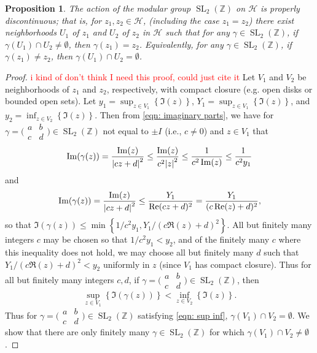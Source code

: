 \documentclass[10pt,leqno,twoside]{article}
\theoremstyle{plain}
\newtheorem{proposition}[lem]{Proposition}
\theoremstyle{definition}
\numberwithin{equation}{section}
\numberwithin{lem}{section}
\newcommand{\cbr}[1]{\left\{#1\right\}}
\DeclareMathOperator{\SL}{SL}
\newcommand{\slz}{\SL_2(\mathbb{Z})}
\newcommand{\sai}[1]{\textcolor{red}{#1}}
\begin{document}
\begin{proposition}\label{prop: properly discontinuous}
    The action of the modular group $\slz$ on $\mathcal H$ is properly discontinuous; that is, for $z_1,z_2\in \mathcal H$, (including the case $z_1 = z_2$) there exist neighborhoods $U_1$ of $z_1$ and $U_2$ of $z_2$ in $\mathcal H$ such that for any $\gamma\in \slz$, if $\gamma(U_1)\cap U_2\neq \emptyset$, then $\gamma(z_1) = z_2$. Equivalently, for any $\gamma\in\slz$, if $\gamma(z_1)\neq z_2$, then $\gamma(U_1)\cap U_2= \emptyset$.
\end{proposition}
\begin{proof}\sai{i kind of don't think I need this proof, could just cite it}
    Let $V_1$ and $V_2$ be neighborhoods of $z_1$ and $z_2$, respectively, with compact closure (e.g. open disks or bounded open sets). Let $y_1 = \sup_{z\in V_1}\cbr{\Im(z)}$, $Y_1 = \sup_{z\in V_1}\cbr{\Im(z)}$, and $y_2 = \inf_{z\in V_2}\cbr{\Im(z)}$. Then from \cref{eqn: imaginary parts}, we have for $\gamma = \big(\!\begin{smallmatrix}
        a & b \\ c & d
    \end{smallmatrix}\!\big)\in \slz$ not equal to $\pm I$ (i.e., $c\neq 0$) and $z\in V_1$ that \[\Im(\gamma(z)) = \frac{\Im(z)}{\abs{cz+d}^2}\leq \frac{\Im(z)}{c^2\abs{z}^2}\leq \frac{1}{c^2\Im(z)}\leq \frac{1}{c^2y_1}\] and \[\Im(\gamma(z)) = \frac{\Im(z)}{\abs{cz+d}^2}\leq \frac{Y_1}{\Re(cz+d)^2} = \frac{Y_1}{(c\Re(z)+d)^2},\] so that $\Im(\gamma(z))\leq\min\cbr{1/c^2y_1,Y_1/(c\Re(z)+d)^2}$. All but finitely many integers $c$ may be chosen so that $1/c^2y_1< y_2$, and of the finitely many $c$ where this inequality does not hold, we may choose all but finitely many $d$ such that $Y_1/(c\Re(z)+d)^2< y_2$ uniformly in $z$ (since $V_1$ has compact closure). Thus for all but finitely many integers $c,d$, if $\gamma  = \big(\!\begin{smallmatrix}
        a & b \\ c & d
    \end{smallmatrix}\!\big)\in \slz$, then \begin{equation}\label{eqn: sup inf}
        \sup_{z\in V_1}\cbr{\Im(\gamma(z))}< \inf_{z\in V_2}\cbr{\Im(z)}.
    \end{equation} Thus for $\gamma = \big(\!\begin{smallmatrix}
        a & b \\ c & d
    \end{smallmatrix}\!\big)\in \slz$ satisfying \cref{eqn: sup inf}, $\gamma(V_1)\cap V_2=\emptyset$. We show that there are only finitely many $\gamma\in \slz$ for which $\gamma(V_1)\cap V_2\neq\emptyset$.


\end{proof}
\end{document}
